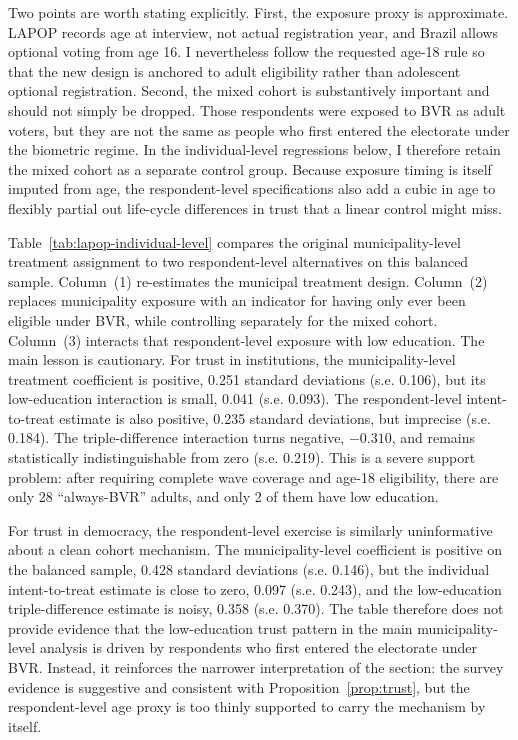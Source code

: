 Two points are worth stating explicitly. First, the exposure proxy is approximate. LAPOP records age at interview, not actual registration year, and Brazil allows optional voting from age 16. I nevertheless follow the requested age-18 rule so that the new design is anchored to adult eligibility rather than adolescent optional registration. Second, the mixed cohort is substantively important and should not simply be dropped. Those respondents were exposed to BVR as adult voters, but they are not the same as people who first entered the electorate under the biometric regime. In the individual-level regressions below, I therefore retain the mixed cohort as a separate control group. Because exposure timing is itself imputed from age, the respondent-level specifications also add a cubic in age to flexibly partial out life-cycle differences in trust that a linear control might miss.

\begin{table}[htbp]
    \caption{Municipality-level and Respondent-level BVR Exposure in LAPOP}
    \label{tab:lapop-individual-level}
    \centering
\end{table}

Table~\ref{tab:lapop-individual-level} compares the original municipality-level treatment assignment to two respondent-level alternatives on this balanced sample. Column~(1) re-estimates the municipal treatment design. Column~(2) replaces municipality exposure with an indicator for having only ever been eligible under BVR, while controlling separately for the mixed cohort. Column~(3) interacts that respondent-level exposure with low education. The main lesson is cautionary. For trust in institutions, the municipality-level treatment coefficient is positive, 0.251 standard deviations (s.e. 0.106), but its low-education interaction is small, 0.041 (s.e. 0.093). The respondent-level intent-to-treat estimate is also positive, 0.235 standard deviations, but imprecise (s.e. 0.184). The triple-difference interaction turns negative, $-0.310$, and remains statistically indistinguishable from zero (s.e. 0.219). This is a severe support problem: after requiring complete wave coverage and age-18 eligibility, there are only 28 ``always-BVR'' adults, and only 2 of them have low education.

For trust in democracy, the respondent-level exercise is similarly uninformative about a clean cohort mechanism. The municipality-level coefficient is positive on the balanced sample, 0.428 standard deviations (s.e. 0.146), but the individual intent-to-treat estimate is close to zero, 0.097 (s.e. 0.243), and the low-education triple-difference estimate is noisy, 0.358 (s.e. 0.370). The table therefore does not provide evidence that the low-education trust pattern in the main municipality-level analysis is driven by respondents who first entered the electorate under BVR. Instead, it reinforces the narrower interpretation of the section: the survey evidence is suggestive and consistent with Proposition~\ref{prop:trust}, but the respondent-level age proxy is too thinly supported to carry the mechanism by itself.

